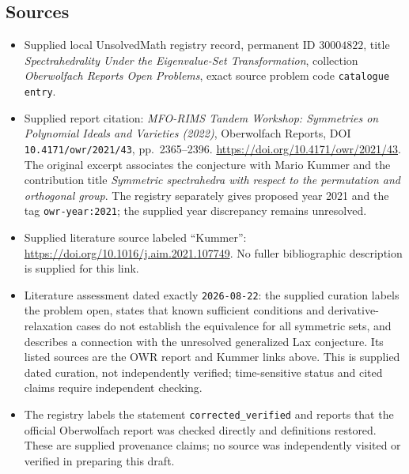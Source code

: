 \documentclass[11pt]{article}
\begin{document}
\subsection{Sources}
\begin{itemize}
\item Supplied local UnsolvedMath registry record, permanent ID \(30004822\), title \emph{Spectrahedrality Under the Eigenvalue-Set Transformation}, collection \emph{Oberwolfach Reports Open Problems}, exact source problem code \texttt{catalogue entry}.
\item Supplied report citation: \emph{MFO-RIMS Tandem Workshop: Symmetries on Polynomial Ideals and Varieties (2022)}, Oberwolfach Reports, DOI \texttt{10.4171/owr/2021/43}, pp.\ 2365--2396. \url{https://doi.org/10.4171/owr/2021/43}. The original excerpt associates the conjecture with Mario Kummer and the contribution title \emph{Symmetric spectrahedra with respect to the permutation and orthogonal group}. The registry separately gives proposed year 2021 and the tag \texttt{owr-year:2021}; the supplied year discrepancy remains unresolved.
\item Supplied literature source labeled ``Kummer'': \url{https://doi.org/10.1016/j.aim.2021.107749}. No fuller bibliographic description is supplied for this link.
\item Literature assessment dated exactly \texttt{2026-08-22}: the supplied curation labels the problem open, states that known sufficient conditions and derivative-relaxation cases do not establish the equivalence for all symmetric sets, and describes a connection with the unresolved generalized Lax conjecture. Its listed sources are the OWR report and Kummer links above. This is supplied dated curation, not independently verified; time-sensitive status and cited claims require independent checking.
\item The registry labels the statement \texttt{corrected\_verified} and reports that the official Oberwolfach report was checked directly and definitions restored. These are supplied provenance claims; no source was independently visited or verified in preparing this draft.
\end{itemize}
\end{document}
